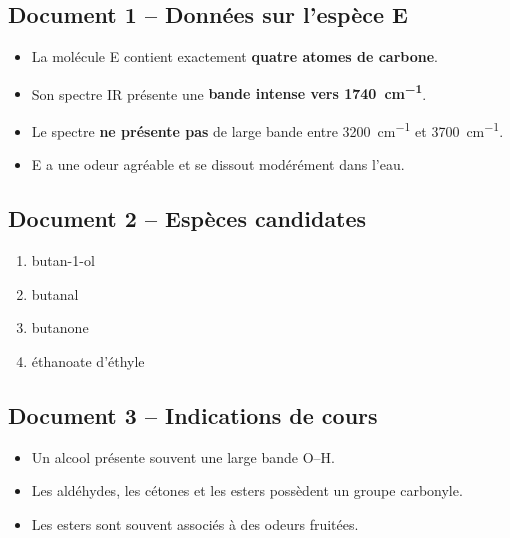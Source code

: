 \documentclass[11pt,a4paper]{article}
\begin{document}
\subsection*{Document 1 -- Données sur l'espèce E}
\begin{itemize}[leftmargin=1.2em]
    \item La molécule E contient exactement \textbf{quatre atomes de carbone}.
    \item Son spectre IR présente une \textbf{bande intense vers \SI{1740}{cm^{-1}}}.
    \item Le spectre \textbf{ne présente pas} de large bande entre \SI{3200}{cm^{-1}} et \SI{3700}{cm^{-1}}.
    \item E a une odeur agréable et se dissout modérément dans l'eau.
\end{itemize}

\subsection*{Document 2 -- Espèces candidates}
\begin{enumerate}[label=\textbf{\Alph*.},leftmargin=1.2em]
    \item butan-1-ol
    \item butanal
    \item butanone
    \item éthanoate d'éthyle
\end{enumerate}

\subsection*{Document 3 -- Indications de cours}
\begin{itemize}[leftmargin=1.2em]
    \item Un alcool présente souvent une large bande O--H.
    \item Les aldéhydes, les cétones et les esters possèdent un groupe carbonyle.
    \item Les esters sont souvent associés à des odeurs fruitées.
\end{itemize}
\end{document}
